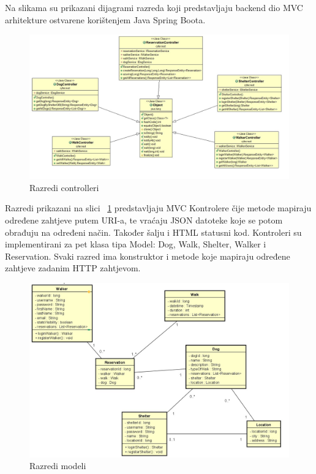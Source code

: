 			\fi
			
			
			Na slikama su prikazani dijagrami razreda koji predstavljaju backend dio MVC arhitekture ostvarene korištenjem Java Spring Boota.
			
			\vspace{15pt} 
			\begin{figure}[H]
				\includegraphics[scale=0.38]{dijagrami/controlleri.jpeg} %
				\centering
				\caption{Razredi controlleri}
				\label{fig:controlleri}
			\end{figure}
			
			
			Razredi prikazani na slici ~\ref{fig:controlleri} predstavljaju MVC Kontrolere čije metode mapiraju određene zahtjeve putem URI-a, te vraćaju JSON datoteke koje se potom obrađuju na određeni način. Također šalju i HTML statusni kod.
			Kontroleri su implementirani za pet klasa tipa Model: Dog, Walk, Shelter, Walker i Reservation. Svaki razred ima konstruktor i metode koje mapiraju određene zahtjeve zadanim HTTP zahtjevom.
			
				\vspace{15pt} 
			\begin{figure}[H]
				\includegraphics[scale=0.4]{dijagrami/modeli.jpeg} %
				\centering
				\caption{Razredi modeli}
				\label{fig:modeli}
			\end{figure}
			
